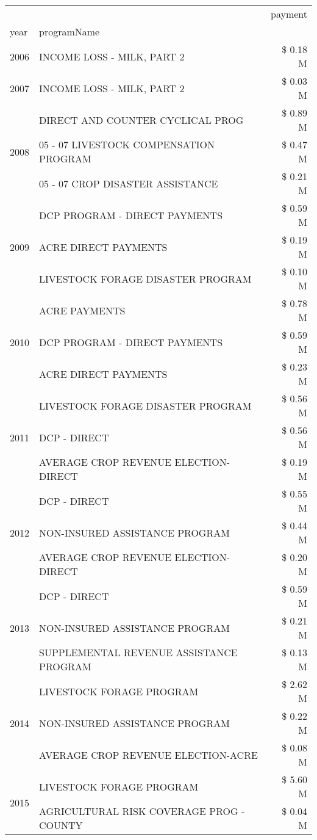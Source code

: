 \begin{tabular}{llr}
\toprule
 &  & payment \\
year & programName &  \\
\midrule
2006 & INCOME LOSS - MILK, PART 2 & \$ 0.18 M \\
\cline{1-3}
2007 & INCOME LOSS - MILK, PART 2 & \$ 0.03 M \\
\cline{1-3}
\multirow[t]{3}{*}{2008} & DIRECT AND COUNTER CYCLICAL PROG & \$ 0.89 M \\
 & 05 - 07 LIVESTOCK COMPENSATION PROGRAM & \$ 0.47 M \\
 & 05 - 07 CROP DISASTER ASSISTANCE & \$ 0.21 M \\
\cline{1-3}
\multirow[t]{3}{*}{2009} & DCP PROGRAM - DIRECT PAYMENTS & \$ 0.59 M \\
 & ACRE DIRECT PAYMENTS & \$ 0.19 M \\
 & LIVESTOCK FORAGE DISASTER  PROGRAM & \$ 0.10 M \\
\cline{1-3}
\multirow[t]{3}{*}{2010} & ACRE PAYMENTS & \$ 0.78 M \\
 & DCP PROGRAM - DIRECT PAYMENTS & \$ 0.59 M \\
 & ACRE DIRECT PAYMENTS & \$ 0.23 M \\
\cline{1-3}
\multirow[t]{3}{*}{2011} & LIVESTOCK FORAGE DISASTER PROGRAM & \$ 0.56 M \\
 & DCP - DIRECT & \$ 0.56 M \\
 & AVERAGE CROP REVENUE ELECTION-DIRECT & \$ 0.19 M \\
\cline{1-3}
\multirow[t]{3}{*}{2012} & DCP - DIRECT & \$ 0.55 M \\
 & NON-INSURED ASSISTANCE PROGRAM & \$ 0.44 M \\
 & AVERAGE CROP REVENUE ELECTION-DIRECT & \$ 0.20 M \\
\cline{1-3}
\multirow[t]{3}{*}{2013} & DCP - DIRECT & \$ 0.59 M \\
 & NON-INSURED ASSISTANCE PROGRAM & \$ 0.21 M \\
 & SUPPLEMENTAL REVENUE ASSISTANCE PROGRAM & \$ 0.13 M \\
\cline{1-3}
\multirow[t]{3}{*}{2014} & LIVESTOCK FORAGE PROGRAM & \$ 2.62 M \\
 & NON-INSURED ASSISTANCE PROGRAM & \$ 0.22 M \\
 & AVERAGE CROP REVENUE ELECTION-ACRE & \$ 0.08 M \\
\cline{1-3}
\multirow[t]{3}{*}{2015} & LIVESTOCK FORAGE PROGRAM & \$ 5.60 M \\
 & AGRICULTURAL RISK COVERAGE PROG - COUNTY & \$ 0.04 M \\

\end{tabular}
